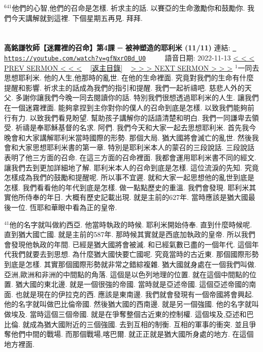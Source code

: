 \documentclass{book}
\begin{document}
$^{641}$他們的心智,他們的召命是怎樣.
祈求主的話.
以賽亞的生命激勵你和鼓勵你.
我們今天講解就到這裡.
下個星期五再見.
拜拜.
\newpage



\section{}
\label{sec:gfNxrOBd_U0}
\textbf{高銘謙牧師【迷霧裡的召命】第4課 ─ 被神塑造的耶利米 (11/11)}
\newline
\newline
連結: \href{https://youtube.com/watch?v=gfNxrOBd_U0}{\texttt{ https://youtube.com/watch?v=gfNxrOBd\_U0}} ~~~~ 語音日期: 2022-11-13 
\newline
\newline
\hyperref[sec:H4gdcVXwfVM]{\small{< < < PREV SERMON < < <}}
~
\hyperref[sec:index]{\small{[返主目錄]}}
~
\hyperref[sec:FHx_k0UyGMs]{\small{> > > NEXT SERMON > > >}}
\newline
\newline
$^{1}$一同去思想耶利米.
他的人生,他那時的亂世.
在他的生命裡面.
究竟對我們的生命有什麼提醒和影響.
祈求主的話成為我們的指引和提醒.
我們一起祈禱吧.
慈悲人外的天父.
多謝你讓我們今晚一同去閱讀你的話.
特別我們很想透過耶利米的人生.
讓我們在一個迷霧裡面.
能夠拿捏到主你對你的僕人的召命到底是怎樣.
以致我們能夠前行有力.
以致我們看見盼望.
幫助孩子講解你的話語清楚和明白.
我們一同謙卑去領受.
祈禱是奉耶穌基督的名求.
阿們.
我們今天和大家一起去思想耶利米.
首先我今晚會和大家講解耶利米當時國際的形勢.
那個大局.
猶大國將會滅亡的亂世.
然後我會和大家思想耶利米書的第一章.
特別是耶利米本人的蒙召的三段說話.
三段說話表明了他三方面的召命.
在這三方面的召命裡面.
我都會運用耶利米書不同的經文.
讓我們去到更加詳細地了解.
耶利米本人的召命到底是怎樣.
這位流淚的先知.
究竟怎樣成為我們的鼓勵和提醒呢.
所以事不宜遲.
就和大家一起思想他的亂世到底是怎樣.
我們看看他的年代到底是怎樣.
做一點點歷史的重溫.
我們會發現.
耶利米其實他所侍奉的年日.
大概有歷史記載出現.
就是主前的627年.
當時應該是猶大國最後一位.
恆耶和華眼中看為正的皇帝.

$^{41}$他的名字就叫做約西亞.
他當時執政的時候.
耶利米開始侍奉.
直到什麼時候呢.
直到猶大國亡國.
就是主前的587年.
那時候其實就是西底加執政的皇帝.
所以我們會發現他執政的年間.
已經是猶大國將會被滅.
和已經氣數已盡的一個年代.
這個年代我們就要去到思想.
為什麼猶大國快要亡國呢.
究竟當時的古近東.
那個國際形勢到底是怎樣.
其實那個國際形勢就非常之錯綜複雜.
猶大國就身處在一個我們叫做.
亞洲,歐洲和非洲的中間點的角落.
這個是以色列地理的位置.
就在這個中間點的位置.
猶大國的東北邊.
就是一個很強的帝國.
當時就是亞述帝國.
這個亞述帝國的南面.
也就是現在的伊拉克的西.
應該是東南邊.
我們就會發現有一個帝國將會興起.
他的名字就叫做巴比倫帝國.
然後猶大國的西南邊.
就是另一個強國.
他的名字就叫做埃及.
當時這個三個帝國.
就是在爭奪整個古近東的控制權.
這個埃及,亞述和巴比倫.
就成為猶大國附近的三個強國.
去到互相的制衡.
互相的軍事的衝突.
並且爭奪他們中間的戰場.
而那個戰場,喀巴爾.
就正正就是猶大國所身處的地方.
在這個地方裡面.
\end{document}
